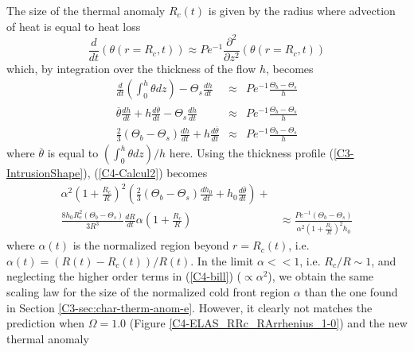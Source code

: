 The size of the thermal anomaly  $R_c(t)$ is given by the radius where
advection of heat is equal to heat loss
\begin{equation}
  \frac{d}{d    t}\left(\theta(r=   R_c,t)\right)    \approx   Pe^{-1}
  \frac{\partial^2}{\partial z^2}\left(\theta(r=R_c,t)\right)
  \label{C4-HeatequationThermal}
\end{equation}
which, by integration over the thickness of the flow $h$, becomes
\begin{eqnarray}
  \frac{d}{dt}\left(\int_0^h\theta           dz\right)-\Theta_s\frac{d
  h}{dt}&\approx& Pe^{-1} \frac{\Theta_b-\Theta_s}{h}\nonumber\\
  \overline{\theta}\frac{d h}{dt}+h\frac{d \overline{\theta}}{dt}-\Theta_s\frac{d
  h}{dt}&\approx& Pe^{-1}
                  \frac{\Theta_b-\Theta_s}{h}\nonumber\\
  \frac{2}{3}\left(\Theta_b-\Theta_s\right)\frac{d h}{d t} +h\frac{d\overline{\theta}}{dt}&\approx& Pe^{-1}
                                                                                                    \frac{\Theta_b-\Theta_s}{h}\label{C4-Calcul2}
\end{eqnarray}
where $\overline{\theta}$  is equal to $(\int_0^h  \theta dz)/h$ here.
Using     the     thickness     profile     (\ref{C3-IntrusionShape}),
(\ref{C4-Calcul2}) becomes
\begin{eqnarray}
  \alpha^2\left(1+\frac{R_c}{R}\right)^2\left(\frac{2}{3}\left(\Theta_b-\Theta_s\right)\frac{d h_0}{d
  t}+h_0\frac{d \overline{\theta}}{d
  t}\right)+&\nonumber\\
  \frac{8h_0R_c^2\left(\Theta_b-\Theta_s\right)}{3R^3}\frac{d
  R}{d
  t}\alpha\left(1+\frac{R_c}{R}\right)                        &\approx
                                                                \frac{Pe^{-1}\left(\Theta_b-\Theta_s\right)}{\alpha^2\left(1+\frac{R_c}{R}\right)^2h_0}
                                                                \label{C4-bill}
\end{eqnarray}
where $\alpha  (t)$ is the  normalized region beyond  $r=R_c(t)$, i.e.
$\alpha(t)= \left(R(t)-R_c(t)\right)/R(t)$. In  the limit $\alpha<<1$,
i.e.   $R_c/R\sim  1$,  and  neglecting  the  higher  order  terms  in
(\ref{C4-bill}) ($\propto  \alpha^2$), we obtain the  same scaling law
for the size of the normalized cold front region $\alpha$ than the one
found in Section  \ref{C3-sec:char-therm-anom-e}.  However, it clearly
not    matches    the    prediction    when    $\Omega=1.0$    (Figure
\ref{C4-ELAS_RRc_RArrhenius_1-0})   and   the  new   thermal   anomaly
